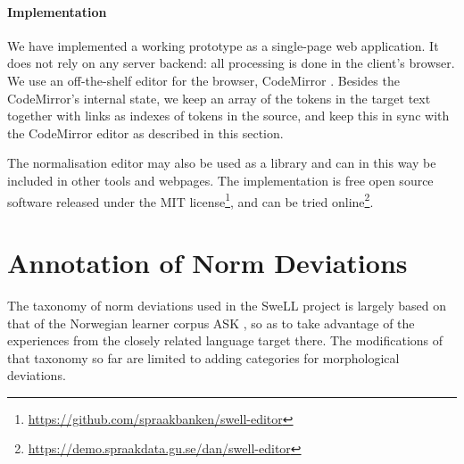 \documentclass[10pt, a4paper]{article}
\newcommand{\dan}[1]{{\color{Fuchsia}{Dan: #1}}}
\newcommand{\elena}[1]{{\color{BrickRed}{Elena: #1}}}
\newcommand{\mats}[1]{{\color{Blue}{Mats: #1}}}
\begin{document}
\paragraph{Implementation}
We have implemented a working prototype as a single-page web application.
It does not rely on any server backend: all processing is done in the
client's browser. We use an off-the-shelf editor for the browser,
CodeMirror \cite{CodeMirror}.
Besides the CodeMirror's internal state, we keep an array of the tokens in the
target text together with links as indexes of tokens in the source,
and keep this in sync with the CodeMirror editor as described in this section.

The normalisation editor may also be used as a library and can in this way
be included in other tools and webpages.
The implementation is free open source software released under the
MIT license\footnote{\url{https://github.com/spraakbanken/swell-editor}},
and can be tried online\footnote{\url{https://demo.spraakdata.gu.se/dan/swell-editor}}.


\section{Annotation of Norm Deviations}
\label{sec:ann_tool}


The taxonomy of norm deviations used in the SweLL project is largely based
on that of the Norwegian learner corpus ASK \cite{tenfjord2006ask},
so as to take advantage of the experiences from the closely related language
target there.
The modifications of that taxonomy so far are limited to adding categories
for morphological deviations.
\end{document}
